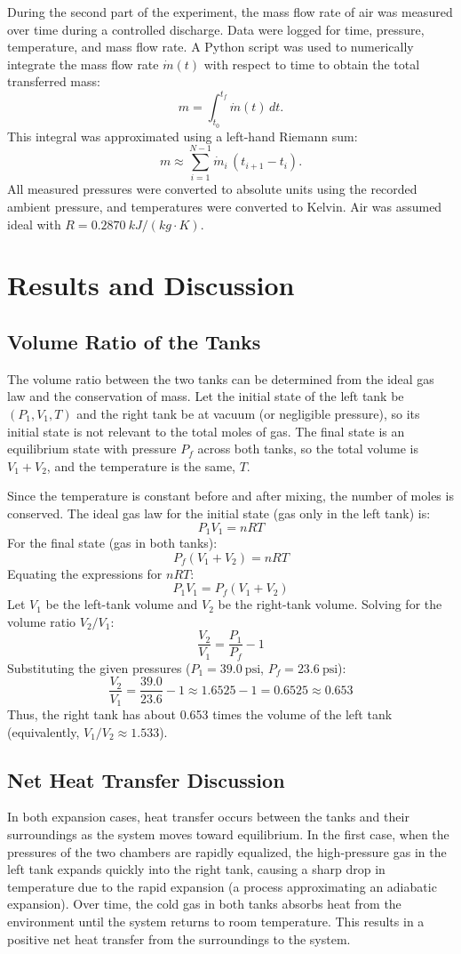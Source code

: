 \documentclass[12pt]{article}
\begin{document}
During the second part of the experiment, the mass flow rate of air was measured over time during a controlled discharge. Data were logged for time, pressure, temperature, and mass flow rate.  
A Python script was used to numerically integrate the mass flow rate \(\dot m(t)\) with respect to time to obtain the total transferred mass:
\[
m = \int_{t_0}^{t_f} \dot m(t)\,dt.
\]
This integral was approximated using a left-hand Riemann sum:
\[
m \approx \sum_{i=1}^{N-1} \dot m_i \,(t_{i+1}-t_i).
\]
All measured pressures were converted to absolute units using the recorded ambient pressure, and temperatures were converted to Kelvin. Air was assumed ideal with \(R = 0.2870~\si{kJ/(kg\cdot K)}\).

\section*{Results and Discussion}

\subsection*{Volume Ratio of the Tanks}
The volume ratio between the two tanks can be determined from the ideal gas law and the conservation of mass. Let the initial state of the left tank be $(P_1, V_1, T)$ and the right tank be at vacuum (or negligible pressure), so its initial state is not relevant to the total moles of gas. The final state is an equilibrium state with pressure $P_f$ across both tanks, so the total volume is $V_1 + V_2$, and the temperature is the same, $T$.

Since the temperature is constant before and after mixing, the number of moles is conserved. The ideal gas law for the initial state (gas only in the left tank) is:
\[ P_1 V_1 = n R T \]
For the final state (gas in both tanks):
\[ P_f (V_1 + V_2) = n R T \]
Equating the expressions for $nRT$:
\[ P_1 V_1 = P_f (V_1 + V_2) \]
Let $V_1$ be the left-tank volume and $V_2$ be the right-tank volume. Solving for the volume ratio $V_2/V_1$:
\[ \frac{V_2}{V_1} = \frac{P_1}{P_f} - 1 \]
Substituting the given pressures ($P_1 = 39.0~\text{psi}$, $P_f = 23.6~\text{psi}$):
\[ \frac{V_2}{V_1} = \frac{39.0}{23.6} - 1 \approx 1.6525 - 1 = 0.6525 \approx 0.653 \]
Thus, the right tank has about 0.653 times the volume of the left tank (equivalently, $V_1/V_2 \approx 1.533$).

\subsection*{Net Heat Transfer Discussion}
In both expansion cases, heat transfer occurs between the tanks and their surroundings as the system moves toward equilibrium. In the first case, when the pressures of the two chambers are rapidly equalized, the high-pressure gas in the left tank expands quickly into the right tank, causing a sharp drop in temperature due to the rapid expansion (a process approximating an adiabatic expansion). Over time, the cold gas in both tanks absorbs heat from the environment until the system returns to room temperature. This results in a positive net heat transfer from the surroundings to the system.
\end{document}

